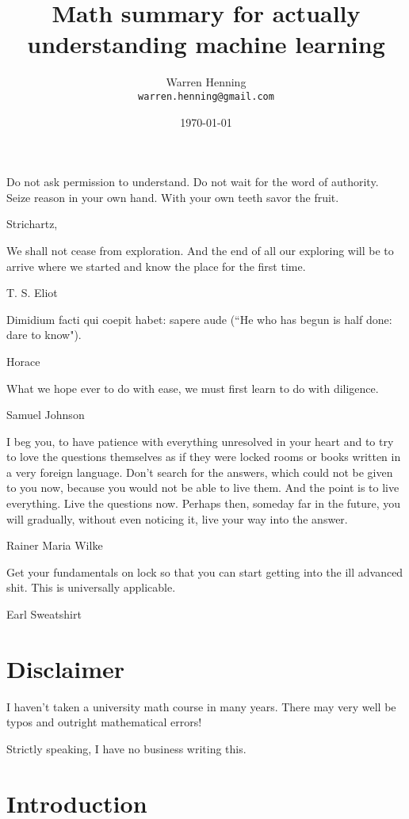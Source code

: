 \documentclass{article}
\theoremstyle{definition}
\begin{document}
\title{Math summary for actually understanding machine learning}
\author{Warren Henning\\\texttt{warren.henning@gmail.com}}
\date{\today}

\maketitle

\tableofcontents

\pagebreak

\epigraph{Do not ask permission to understand. Do not wait for the word of authority. Seize reason in your own hand. With your own teeth savor the fruit.}{Strichartz, \cite{strichartz}}

\epigraph{We shall not cease from exploration. And the end of all our exploring will be to arrive where we started and know the place for the first time.}{T. S. Eliot}

\epigraph{Dimidium facti qui coepit habet: sapere aude (``He who has begun is half done: dare to know").}{Horace}

\epigraph{What we hope ever to do with ease, we must first learn to do with diligence.}{Samuel Johnson}

\epigraph{I beg you, to have patience with everything unresolved in your heart and to try to love the questions themselves as if they were locked rooms or books written in a very foreign language. Don’t search for the answers, which could not be given to you now, because you would not be able to live them. And the point is to live everything. Live the questions now. Perhaps then, someday far in the future, you will gradually, without even noticing it, live your way into the answer.}{Rainer Maria Wilke}

\epigraph{Get your fundamentals on lock so that you can start getting into the ill advanced shit. This is universally applicable.}{Earl Sweatshirt}

\section{Disclaimer}

I haven't taken a university math course in many years. There may very well
be typos and outright mathematical errors!

Strictly speaking, I have no business writing this.

\section{Introduction}
\end{document}
